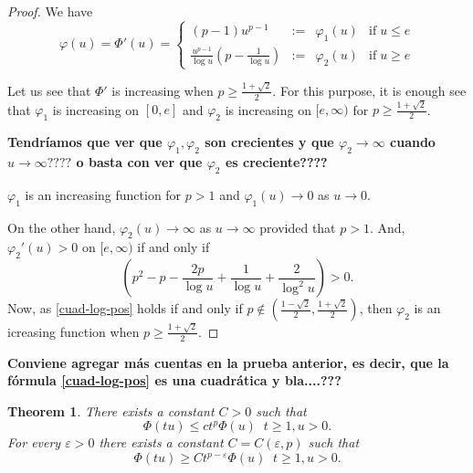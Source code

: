 \documentclass[twoside]{article}
\newtheorem{thm}{Theorem}[section]
\theoremstyle{remark}
\renewcommand{\leq}{\leqslant}
\renewcommand{\geq}{\geqslant}
\begin{document}
\begin{proof}
We have 
\[\varphi(u)=\Phi'(u)=\left\{
\begin{array}{cccc}
(p-1)u^{p-1}&:=&\varphi_1(u)& \mbox{if}\;u\leq e
\\
\frac{u^{p-1}}{\log u}(p-\frac{1}{\log u})&:=&\varphi_2(u)&\mbox{if}\; u\geq e
\end{array}
\right.
\]

Let us see that $\Phi'$ is increasing when $p\geq \frac{1+\sqrt {2}}{2}$.
For this purpose, it is enough see that $\varphi_1$ is increasing  on $[0,e]$ and $\varphi_2$ is increasing on 
$[e,\infty)$ for $p\geq \frac{1+\sqrt {2}}{2}$.

{\bf Tendr\'iamos que ver que $\varphi_1,\varphi_2$ son crecientes y que $\varphi_2\to \infty$ cuando
$u \to \infty????$ o basta con ver que $\varphi_2$ es creciente????}

$\varphi_1$ is an increasing function for $p>1$ and $\varphi_1(u)\to 0$ as $u \to 0$.

On the other hand, $\varphi_2(u)\to \infty$ as $u \to \infty$ provided that $p>1$.
And,  
$\varphi_2'(u)>0$
on $[e,\infty)$ if and only if 
\begin{equation}\label{cuad-log-pos}
\left(p^2-p-\frac{2p}{\log u}+\frac{1}{\log u}+\frac{2}{\log^2 u}\right)>0.
\end{equation}
Now, as \eqref{cuad-log-pos} holds if and only if $p \notin(\frac{1-\sqrt2}{2},\frac{1+\sqrt2}{2})$, then $\varphi_2$ is an icreasing function when $p\geq \frac{1+\sqrt2}{2}$.
\end{proof}

{\bf  Conviene agregar m\'as cuentas en la prueba anterior, es decir, que la f\'ormula \eqref{cuad-log-pos} es una cuadr\'atica y bla....???}

\begin{thm}
There exists a constant $C>0$ such that 
\begin{equation}\label{cota-sup-indices}
\Phi(tu)\leq ct^p\Phi(u)\;\;t\geq 1, u>0.
\end{equation}
For every $\varepsilon>0$ there exists a constant $C=C(\varepsilon,p)$ such that
\begin{equation}\label{cota-inf-indices}
\Phi(tu)\geq Ct^{p-\varepsilon}\Phi(u)\;\;t\geq 1,u>0.
\end{equation}
\end{thm}
\end{document}
